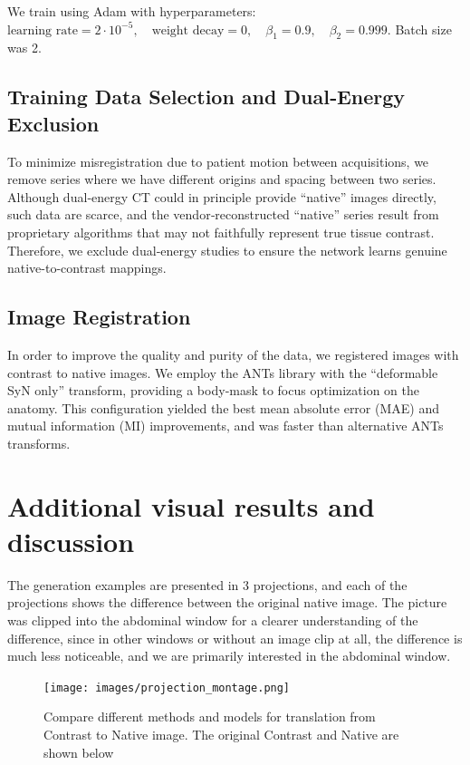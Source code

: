 \documentclass{article}
\begin{document}
We train using Adam with hyperparameters: $
  \text{learning rate}=2\cdot10^{-5},\quad
  \text{weight decay}=0,\quad
  \beta_1=0.9,\quad
  \beta_2=0.999.$ Batch size was 2.

\subsection{Training Data Selection and Dual‐Energy Exclusion}
To minimize misregistration due to patient motion between acquisitions, we remove series where we have different origins and spacing between two series. Although dual‐energy CT could in principle provide “native” images directly, such data are scarce, and the vendor‐reconstructed “native” series result from proprietary algorithms that may not faithfully represent true tissue contrast. Therefore, we exclude dual‐energy studies to ensure the network learns genuine native-to-contrast mappings.

\subsection{Image Registration}
In order to improve the quality and purity of the data, we registered images with contrast to native images. We employ the ANTs library with the “deformable SyN only” transform, providing a body‐mask to focus optimization on the anatomy. This configuration yielded the best mean absolute error (MAE) and mutual information (MI) improvements, and was faster than alternative ANTs transforms.


\section{Additional visual results and discussion}
The generation examples are presented in 3 projections, and each of the projections shows the difference between the original native image. The picture was clipped into the abdominal window for a clearer understanding of the difference, since in other windows or without an image clip at all, the difference is much less noticeable, and we are primarily interested in the abdominal window.
\begin{figure}[h!]
    \centering
    \texttt{[image: images/projection\_montage.png]}
    \caption{Compare different methods and models for translation from Contrast to Native image. The original Contrast and Native are shown below}
    \label{app:image_visual}
\end{figure}
\end{document}
